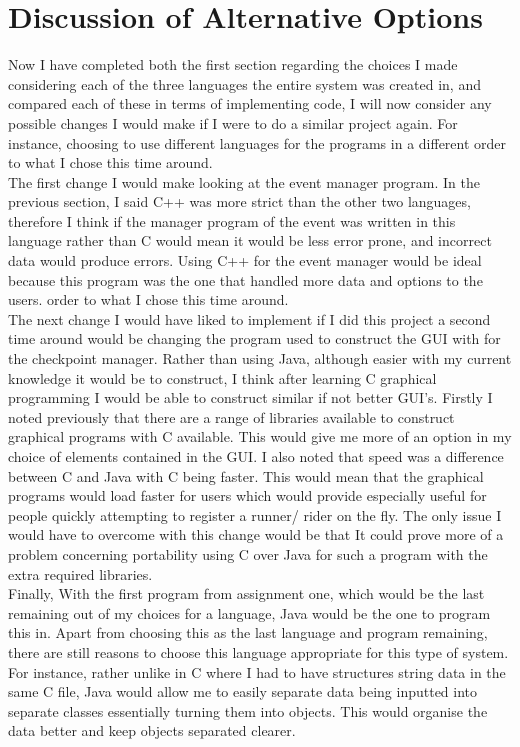 \documentclass[a4paper]{article}
\begin{document}
\section{Discussion of Alternative Options}
Now I have completed both the first section regarding the choices I made
considering each of the three languages the entire system was created in, and
compared each of these in terms of implementing code, I will now consider any
possible changes I would make if I were to do a similar project again. For 
instance, choosing to use different languages for the programs in a different 
order to what I chose this time around. 
 \\[4mm]
The first change I would make looking at the event manager program. In the 
previous section, I said C++ was more strict than the other two languages, 
therefore I think if the manager program of the event was written in this 
language rather than C would mean it would be less error prone, and incorrect
data would produce errors. Using C++ for the event manager would be ideal 
because this program was the one that handled more data and options to the users. 
order to what I chose this time around. 
 \\[4mm]
The next change I would have liked to implement if I did this project a second 
time around would be changing the program used to construct the GUI with for 
the checkpoint manager. Rather than using Java, although easier with my current 
knowledge it would be to construct, I think after learning C graphical programming 
I would be able to construct similar if not better GUI's. Firstly I noted previously 
that there are a range of libraries available to construct graphical programs 
with C available. This would give me more of an option in my choice of elements 
contained in the GUI. I also noted that speed was a difference between C and Java 
with C being faster. This would mean that the graphical programs would load 
faster for users which would provide especially useful for people 
quickly attempting to register a runner/ rider on the fly. The only issue I 
would have to overcome with this change would be that It could prove more 
of a problem concerning portability using C over Java for such a program 
with the extra required libraries.
 \\[4mm]
Finally, With the first program from assignment one, which would be the last remaining 
out of my choices for a language, Java would be the one to program this in. Apart 
from choosing this as the last language and program remaining, there are still 
reasons to choose this language appropriate for this type of system. For instance, 
rather unlike in C where I had to have structures string data in the same C file, 
Java would allow me to easily separate data being inputted into separate classes 
essentially turning them into objects. This would organise the data better and keep
objects separated clearer.
\end{document}
